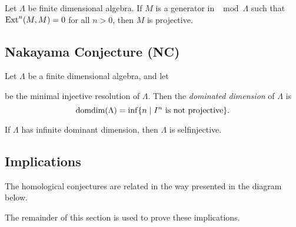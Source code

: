 \begin{conj} 
	Let $\Lambda$ be  finite dimensional algebra. If $M$ is a generator in $\mod\Lambda$ such that  $\operatorname{Ext}^n(M, M) = 0$ for all $n > 0$, then $M$ is projective. 
\end{conj}

\subsection*{Nakayama Conjecture (NC)}

\begin{defn}
	Let $\Lambda$ be a finite dimensional algebra, and let
	\begin{center}
	\end{center}
	be the minimal injective resolution of $\Lambda$. Then the \emph{dominated dimension} of $\Lambda$ is $$\operatorname{domdim}(\Lambda) = \inf\{n \; | \; I^n\text{ is not projective} \}.$$
\end{defn}

\begin{conj} 
	If $\Lambda$ has infinite dominant dimension, then $\Lambda$ is selfinjective.
\end{conj}

\subsection{Implications}
The homological conjectures are related in the way presented in the diagram below.


The remainder of this section is used to prove these implications.

